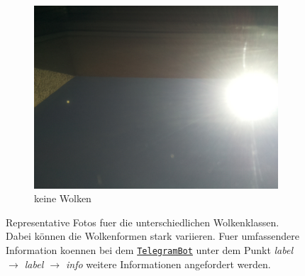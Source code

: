 \begin{figure}[h]
\begin{subfigure}[b]{0.31\textwidth}
		\end{subfigure}
		\begin{subfigure}[b]{0.31\textwidth}
		\begin{center}
				\includegraphics[width=\textwidth]{./pictures/cloudtypes/no_clouds.pdf}
		\end{center}
		\caption{keine Wolken}
		\label{fig:no_clouds}
		\end{subfigure}
		\caption{Representative Fotos fuer die unterschiedlichen Wolkenklassen.
		Dabei können die Wolkenformen stark variieren. Fuer umfassendere
		Information koennen bei dem
		\href{https://telegram.me/weatherpi_bot}{\texttt{TelegramBot}} unter dem
		Punkt \textit{label $\rightarrow$ label $\rightarrow$ info} weitere 
		Informationen angefordert werden.}
		\label{fig:}
\end{figure}
